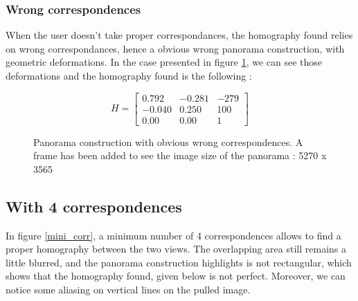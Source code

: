 \documentclass[12pt,a4paper,onecolumn]{article}
\begin{document}
\subsubsection{Wrong correspondences}

When the user doesn't take proper correspondances, the homography found relies on wrong correspondances, hence a obvious wrong panorama construction, with geometric deformations.
In the case presented in figure \ref{wrong_corr}, we can see those deformations and the homography found is the following :

$$ H =
\begin{bmatrix}
0.792 & -0.281 & -279\\
-0.040 & 0.250 & 100\\
0.00 & 0.00 & 1
\end{bmatrix}
$$

\begin{figure}[H]
\begin{center}
\end{center}
\caption{Panorama construction with obvious wrong correspondences. A frame has been added to see the image size of the panorama : 5270 x 3565}
\label{wrong_corr}
\end{figure}

\subsection{With 4 correspondences}

In figure \ref{mini_corr}, a minimum number of 4 correspondences allows to find a proper homography between the two views. The overlapping area still remains a little blurred, and the panorama construction highlights is not rectangular, which shows that the homography found, given below is not perfect. Moreover, we can notice some aliasing on vertical lines on the pulled image.
\end{document}
